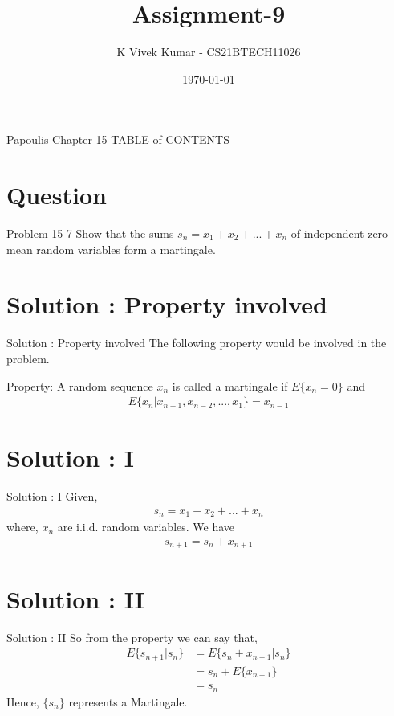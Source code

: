 \documentclass{beamer}
\title{Assignment-9}
\author{K Vivek Kumar - CS21BTECH11026}
\date{\today}
\begin{document}
\begin{frame}
    \titlepage 
\end{frame}

\logo{}


\begin{frame}{Papoulis-Chapter-15}
TABLE of CONTENTS
    \tableofcontents
\end{frame}


\section{Question}
\begin{frame}{Problem 15-7}
Show that the sums $s_n = x_1 + x_2 + ... + x_n$ of independent zero mean random variables form a martingale. 
\end{frame}

\section{Solution : Property involved}
\begin{frame}{Solution : Property involved}
The following property would be involved in the problem.\\
\begin{block}{Property:}
A random sequence $x_{n}$ is called a martingale if $E\{x_n=0\}$ and 
\begin{align}
E\{x_n|x_{n-1},x_{n-2},...,x_1\}=x_{n-1}
\end{align}
    \end{block}
\end{frame}


\section{Solution : I}
\begin{frame}{Solution : I}
Given,
	\begin{align}
	s_n = x_1 + x_2 + ... + x_n
	\end{align}
	where, $x_n$ are i.i.d. random variables. We have
	\begin{align}
	s_{n+1} = s_n + x_{n+1}
	\end{align}
\end{frame} 
\section{Solution : II}
\begin{frame}{Solution : II}
	So from the property we can say that,
	\begin{align}
	E\{s_{n+1}|s_{n}\}&=E\{s_{n}+x_{n+1}|s_{n}\}\\
	&=s_{n}+E\{x_{n+1}\}\\
	&=s_n
	\end{align}
	Hence, $\{s_n\}$ represents a Martingale.
\end{frame} 
\end{document}
